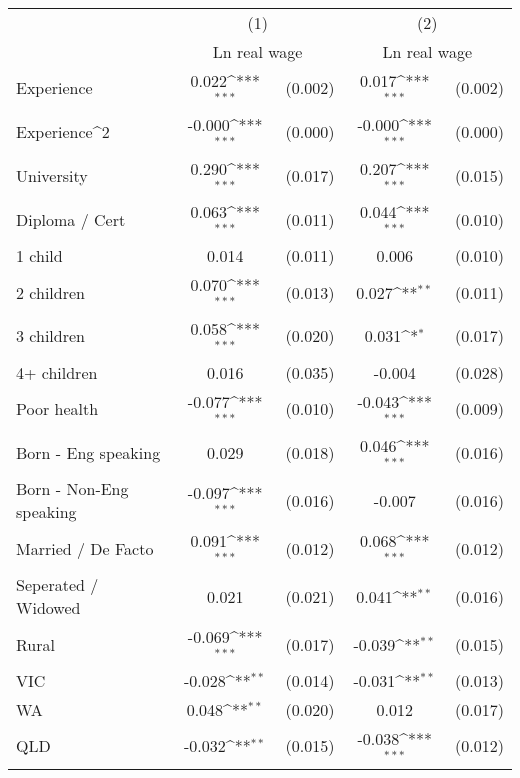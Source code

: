 {
\def\sym#1{\ifmmode^{#1}\else\(^{#1}\)\fi}
\begin{tabular}{l*{2}{cc}}
\hline\hline
                    &\multicolumn{2}{c}{(1)}           &\multicolumn{2}{c}{(2)}           \\
                    &\multicolumn{2}{c}{Ln real wage}  &\multicolumn{2}{c}{Ln real wage}  \\
\hline
Experience          &       0.022\sym{***}&     (0.002)&       0.017\sym{***}&     (0.002)\\
Experience^{2}      &      -0.000\sym{***}&     (0.000)&      -0.000\sym{***}&     (0.000)\\
University          &       0.290\sym{***}&     (0.017)&       0.207\sym{***}&     (0.015)\\
Diploma / Cert      &       0.063\sym{***}&     (0.011)&       0.044\sym{***}&     (0.010)\\
1 child             &       0.014         &     (0.011)&       0.006         &     (0.010)\\
2 children          &       0.070\sym{***}&     (0.013)&       0.027\sym{**} &     (0.011)\\
3 children          &       0.058\sym{***}&     (0.020)&       0.031\sym{*}  &     (0.017)\\
4+ children         &       0.016         &     (0.035)&      -0.004         &     (0.028)\\
Poor health         &      -0.077\sym{***}&     (0.010)&      -0.043\sym{***}&     (0.009)\\
Born - Eng speaking &       0.029         &     (0.018)&       0.046\sym{***}&     (0.016)\\
Born - Non-Eng speaking&      -0.097\sym{***}&     (0.016)&      -0.007         &     (0.016)\\
Married / De Facto  &       0.091\sym{***}&     (0.012)&       0.068\sym{***}&     (0.012)\\
Seperated / Widowed &       0.021         &     (0.021)&       0.041\sym{**} &     (0.016)\\
Rural               &      -0.069\sym{***}&     (0.017)&      -0.039\sym{**} &     (0.015)\\
VIC                 &      -0.028\sym{**} &     (0.014)&      -0.031\sym{**} &     (0.013)\\
WA                  &       0.048\sym{**} &     (0.020)&       0.012         &     (0.017)\\
QLD                 &      -0.032\sym{**} &     (0.015)&      -0.038\sym{***}&     (0.012)\\

\end{tabular}}
